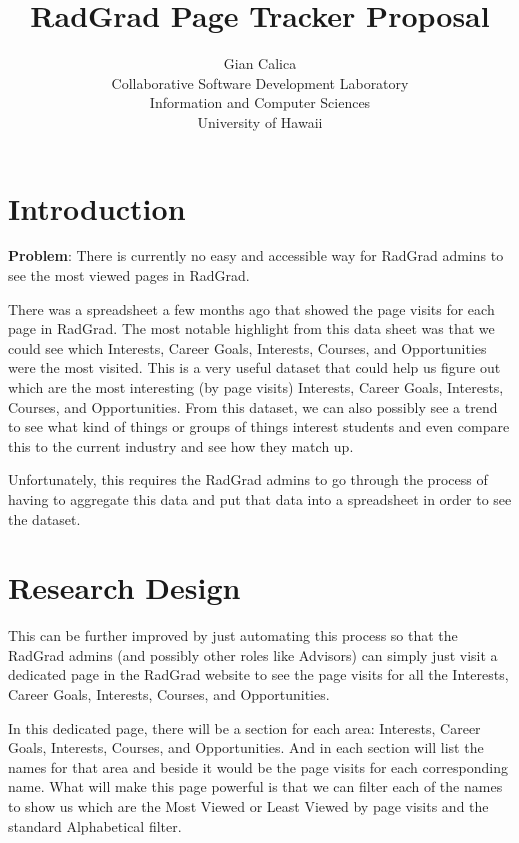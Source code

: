 \documentclass[english]{proposalnsf}
\title{RadGrad Page Tracker Proposal}
\author{Gian Calica \\Collaborative Software Development Laboratory \\ Information and Computer Sciences \\ University of Hawaii}
\begin{document}
    \maketitle
    \tableofcontents
    \newpage

    \section{Introduction}
    \label{sec:introduction}
    
    \textbf{Problem}: There is currently no easy and accessible way for RadGrad admins to see the most viewed pages in RadGrad.

    There was a spreadsheet a few months ago that showed the page visits for each page in RadGrad.
    The most notable highlight from this data sheet was that we could see which Interests, Career Goals, Interests, Courses, and Opportunities were the most visited.
    This is a very useful dataset that could help us figure out which are the most interesting (by page visits) Interests, Career Goals, Interests, Courses, and Opportunities.
    From this dataset, we can also possibly see a trend to see what kind of things or groups of things interest students and even compare this to the current industry and see how they match up.

    Unfortunately, this requires the RadGrad admins to go through the process of having to aggregate this data and put that data into a spreadsheet in order to see the dataset.

    \section{Research Design}
    \label{sec:research-design}

    This can be further improved by just automating this process so that the RadGrad admins (and possibly other roles like Advisors) can simply just visit a dedicated page in the RadGrad website to see the page visits for all the Interests, Career Goals, Interests, Courses, and Opportunities.

    In this dedicated page, there will be a section for each area: Interests, Career Goals, Interests, Courses, and Opportunities.
    And in each section will list the names for that area and beside it would be the page visits for each corresponding name.
    What will make this page powerful is that we can filter each of the names to show us which are the Most Viewed or Least Viewed by page visits and the standard Alphabetical filter.
\end{document}
